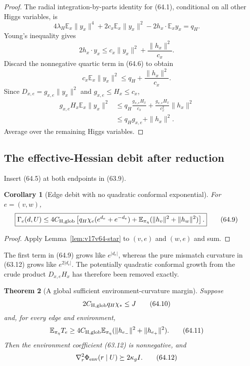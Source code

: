 \documentclass[11pt]{article}
\newtheorem{theorem}{Theorem}[section]
\newtheorem{corollary}[theorem]{Corollary}
\theoremstyle{remark}
\begin{document}
\begin{proof}
The radial integration-by-parts identity for (64.1), conditional on
all other Higgs variables, is
\[
 4\lambda_H\mathbb E_x\|y_x\|^4
 +2c_x\mathbb E_x\|y_x\|^2
 -2h_x\cdot\mathbb E_xy_x
 =q_H.                                            \tag{64.6}
\]
Young's inequality gives
\[
 2h_x\cdot y_x
 \leq c_x\|y_x\|^2+\frac{\|h_x\|^2}{c_x}.
\]
Discard the nonnegative quartic term in (64.6) to obtain
\[
 c_x\mathbb E_x\|y_x\|^2
 \leq q_H+\frac{\|h_x\|^2}{c_x}.                 \tag{64.7}
\]
Since \(D_{x,e}=g_{x,e}\|y_x\|^2\) and
\(g_{x,e}\leq H_x\leq c_x\),
\[
\begin{aligned}
 g_{x,e}H_x\mathbb E_x\|y_x\|^2
 &\leq
 q_H\frac{g_{x,e}H_x}{c_x}
 +\frac{g_{x,e}H_x}{c_x^2}\|h_x\|^2\\
 &\leq q_Hg_{x,e}+\|h_x\|^2.                     \tag{64.8}
\end{aligned}
\]
Average over the remaining Higgs variables.
\end{proof}

\subsection{The effective-Hessian debit after reduction}

Insert (64.5) at both endpoints in (63.9).

\begin{corollary}[Edge debit with no quadratic conformal exponential]
\label{cor:v17v64-debit}
For \(e=(v,w)\),
\[
\boxed{
 \Gamma_e(d,U)
 \leq
 4C_{\rm H,glob}\left[
 q_H\chi_e(e^{d_e}+e^{-d_e})
 +\mathbb E_{\pi_\eta}
 (\|h_v\|^2+\|h_w\|^2)
 \right].}                                       \tag{64.9}
\]
\end{corollary}

\begin{proof}
Apply Lemma~\ref{lem:v17v64-star} to
\((v,e)\) and \((w,e)\) and sum.
\end{proof}

The first term in (64.9) grows like \(e^{|d_e|}\), whereas the pure
mismatch curvature in (63.12) grows like \(e^{2|d_e|}\).  The
potentially quadratic conformal growth from the crude product
\(D_{x,e}H_x\) has therefore been removed exactly.

\begin{theorem}[A global sufficient environment-curvature margin]
\label{thm:v17v64-margin}
Suppose
\[
 2C_{\rm H,glob}q_H\chi_*\leq J                  \tag{64.10}
\]
and, for every edge and environment,
\[
 \mathbb E_{\pi_\eta}T_e
 \geq
 4C_{\rm H,glob}
 \mathbb E_{\pi_\eta}(\|h_{e_-}\|^2+\|h_{e_+}\|^2).              \tag{64.11}
\]
Then the environment coefficient (63.12) is nonnegative, and
\[
 \nabla_r^2\Phi_{\rm env}(r\mid U)
 \succeq2\kappa_gI.                               \tag{64.12}
\]
\end{theorem}
\end{document}
